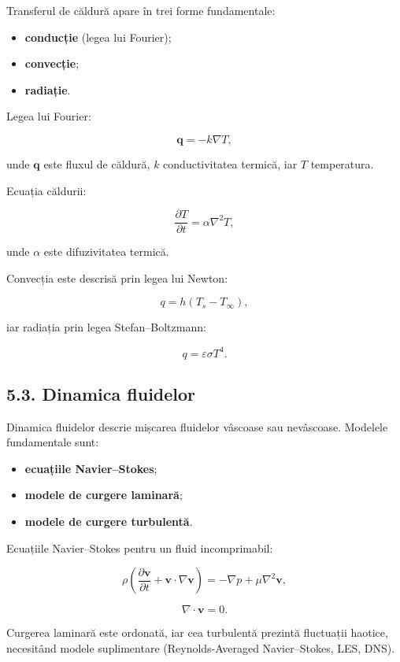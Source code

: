 \documentclass[12pt,a4paper]{article}
\begin{document}
Transferul de căldură apare în trei forme fundamentale:

\begin{itemize}
    \item \textbf{conducție} (legea lui Fourier);
    \item \textbf{convecție};
    \item \textbf{radiație}.
\end{itemize}

Legea lui Fourier:


\[
\mathbf{q} = -k \nabla T,
\]


unde $\mathbf{q}$ este fluxul de căldură, $k$ conductivitatea termică, iar $T$ temperatura.

Ecuația căldurii:


\[
\frac{\partial T}{\partial t} = \alpha \nabla^2 T,
\]


unde $\alpha$ este difuzivitatea termică.

Convecția este descrisă prin legea lui Newton:


\[
q = h (T_s - T_\infty),
\]


iar radiația prin legea Stefan–Boltzmann:


\[
q = \varepsilon \sigma T^4.
\]



\subsection{5.3. Dinamica fluidelor}

Dinamica fluidelor descrie mișcarea fluidelor vâscoase sau nevâscoase. Modelele fundamentale sunt:

\begin{itemize}
    \item \textbf{ecuațiile Navier–Stokes};
    \item \textbf{modele de curgere laminară};
    \item \textbf{modele de curgere turbulentă}.
\end{itemize}

Ecuațiile Navier–Stokes pentru un fluid incomprimabil:


\[
\rho \left( \frac{\partial \mathbf{v}}{\partial t} + \mathbf{v} \cdot \nabla \mathbf{v} \right)
= -\nabla p + \mu \nabla^2 \mathbf{v},
\]




\[
\nabla \cdot \mathbf{v} = 0.
\]



Curgerea laminară este ordonată, iar cea turbulentă prezintă fluctuații haotice, necesitând modele suplimentare (Reynolds-Averaged Navier–Stokes, LES, DNS).
\end{document}
